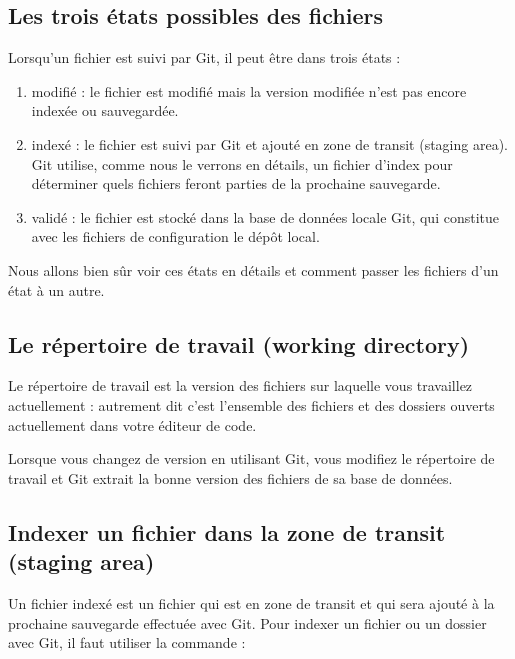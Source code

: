 \documentclass{article}
\begin{document}
\subsection{Les trois états possibles des fichiers}
Lorsqu'un fichier est suivi par {\color{blue} Git}, il peut être dans trois états :
\begin{enumerate}
\item  modifié : le fichier est modifié mais la version modifiée n'est pas encore indexée ou sauvegardée.

\item  indexé : le fichier est suivi par {\color{blue} Git} et ajouté en zone de transit ({\color{blue}staging area}). {\color{blue}Git} utilise, comme nous le verrons en détails, un fichier d'{\color{blue}index} pour déterminer quels fichiers feront parties de la prochaine sauvegarde.

\item  validé : le fichier est stocké dans la base de données locale {\color{blue} Git}, qui constitue avec les fichiers de configuration le dépôt local.
\end{enumerate}


Nous allons bien sûr voir ces états en détails et comment passer les fichiers d'un état à un autre.

\subsection{Le répertoire de travail ({\color{blue}working directory})}

Le répertoire de travail est la version des fichiers sur laquelle vous travaillez actuellement : autrement dit c'est l'ensemble des fichiers et des dossiers ouverts actuellement dans votre éditeur de code.

Lorsque vous changez de version en utilisant {\color{blue} Git}, vous modifiez le répertoire de travail et {\color{blue} Git} extrait la bonne version des fichiers de sa base de données.

\subsection{Indexer un fichier dans la zone de transit ({\color{blue}staging area})}
Un fichier indexé est un fichier qui est en zone de transit et qui sera ajouté à la prochaine sauvegarde effectuée avec {\color{blue} Git}. Pour indexer un fichier ou un dossier avec {\color{blue} Git}, il faut utiliser la commande :
\end{document}
